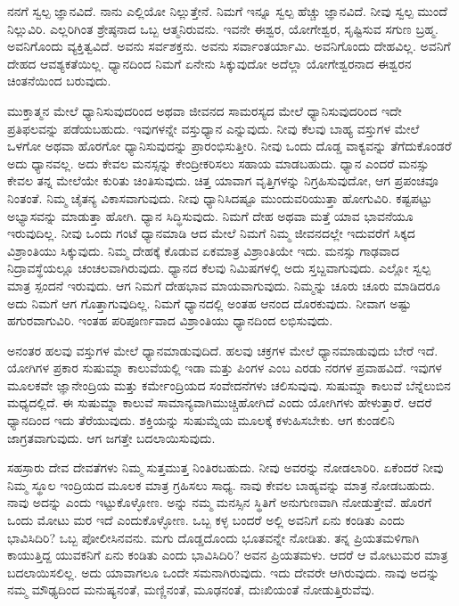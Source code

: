ನನಗೆ ಸ್ವಲ್ಪ ಜ್ಞಾನವಿದೆ. ನಾನು ಎಲ್ಲಿಯೋ ನಿಲ್ಲುತ್ತೇನೆ. ನಿಮಗೆ ಇನ್ನೂ ಸ್ವಲ್ಪ ಹೆಚ್ಚು ಜ್ಞಾನವಿದೆ. ನೀವು ಸ್ವಲ್ಪ ಮುಂದೆ ನಿಲ್ಲುವಿರಿ. ಎಲ್ಲರಿಗಿಂತ ಶ್ರೇಷ್ಠನಾದ ಒಬ್ಬ ಆತ್ಮನಿರುವನು. ಇವನೇ ಈಶ್ವರ, ಯೋಗೇಶ್ವರ, ಸೃಷ್ಟಿಸುವ ಸಗುಣ ಬ್ರಹ್ಮ. ಅವನಿಗೊಂದು ವ್ಯಕ್ತಿತ್ವವಿದೆ. ಅವನು ಸರ್ವಶಕ್ತನು. ಅವನು ಸರ್ವಾಂತರ್ಯಾಮಿ. ಅವನಿಗೊಂದು ದೇಹವಿಲ್ಲ. ಅವನಿಗೆ ದೇಹದ ಆವಶ್ಯಕತೆಯಿಲ್ಲ. ಧ್ಯಾನದಿಂದ ನಿಮಗೆ ಏನೇನು ಸಿಕ್ಕುವುದೋ ಅದೆಲ್ಲಾ ಯೋಗೇಶ್ವರನಾದ ಈಶ್ವರನ ಚಿಂತನೆಯಿಂದ ಬರುವುದು.

ಮುಕ್ತಾತ್ಮನ ಮೇಲೆ ಧ್ಯಾನಿಸುವುದರಿಂದ ಅಥವಾ ಜೀವನದ ಸಾಮರಸ್ಯದ ಮೇಲೆ ಧ್ಯಾನಿಸುವುದರಿಂದ ಇದೇ ಪ್ರತಿಫಲವನ್ನು ಪಡೆಯಬಹುದು. ಇವುಗಳನ್ನೇ ವಸ್ತುಧ್ಯಾನ ಎನ್ನುವುದು. ನೀವು ಕೆಲವು ಬಾಹ್ಯ ವಸ್ತುಗಳ ಮೇಲೆ ಒಳಗೋ ಅಥವಾ ಹೊರಗೋ ಧ್ಯಾನಿಸುವುದನ್ನು ಪ್ರಾರಂಭಿಸುತ್ತೀರಿ. ನೀವು ಒಂದು ದೊಡ್ಡ ವಾಕ್ಯವನ್ನು ತೆಗೆದುಕೊಂಡರೆ ಅದು ಧ್ಯಾನವಲ್ಲ. ಅದು ಕೇವಲ ಮನಸ್ಸನ್ನು ಕೇಂದ್ರೀಕರಿಸಲು ಸಹಾಯ ಮಾಡಬಹುದು. ಧ್ಯಾನ ಎಂದರೆ ಮನಸ್ಸು ಕೇವಲ ತನ್ನ ಮೇಲೆಯೇ ಕುರಿತು ಚಿಂತಿಸುವುದು. ಚಿತ್ತ ಯಾವಾಗ ವೃತ್ತಿಗಳನ್ನು ನಿಗ್ರಹಿಸುವುದೋ, ಆಗ ಪ್ರಪಂಚವೂ ನಿಂತಂತೆ. ನಿಮ್ಮ ಚೈತನ್ಯ ವಿಕಾಸವಾಗುವುದು. ನೀವು ಧ್ಯಾನಿಸಿದಷ್ಟೂ ಮುಂದುವರಿಯುತ್ತಾ ಹೋಗುವಿರಿ. ಕಷ್ಟಪಟ್ಟು ಅಭ್ಯಾಸವನ್ನು ಮಾಡುತ್ತಾ ಹೋಗಿ. ಧ್ಯಾನ ಸಿದ್ಧಿಸುವುದು. ನಿಮಗೆ ದೇಹ ಅಥವಾ ಮತ್ತೆ ಯಾವ ಭಾವನೆಯೂ ಇರುವುದಿಲ್ಲ. ನೀವು ಒಂದು ಗಂಟೆ ಧ್ಯಾನಮಾಡಿ ಆದ ಮೇಲೆ ನಿಮಗೆ ನಿಮ್ಮ ಜೀವನದಲ್ಲೇ ಇದುವರೆಗೆ ಸಿಕ್ಕದ ವಿಶ್ರಾಂತಿಯು ಸಿಕ್ಕುವುದು. ನಿಮ್ಮ ದೇಹಕ್ಕೆ ಕೊಡುವ ಏಕಮಾತ್ರ ವಿಶ್ರಾಂತಿಯೇ ಇದು. ಮನಸ್ಸು ಗಾಢವಾದ ನಿದ್ರಾವಸ್ಥೆಯಲ್ಲೂ ಚಂಚಲವಾಗಿರುವುದು. ಧ್ಯಾನದ ಕೆಲವು ನಿಮಿಷಗಳಲ್ಲಿ ಅದು ಸ್ತಬ್ದವಾಗುವುದು. ಎಲ್ಲೋ ಸ್ವಲ್ಪ ಮಾತ್ರ ಸ್ಪಂದನೆ ಇರುವುದು. ಆಗ ನಿಮಗೆ ದೇಹಭಾವ ಮಾಯವಾಗುವುದು. ನಿಮ್ಮನ್ನು ಚೂರು ಚೂರು ಮಾಡಿದರೂ ಅದು ನಿಮಗೆ ಆಗ ಗೊತ್ತಾಗುವುದಿಲ್ಲ. ನಿಮಗೆ ಧ್ಯಾನದಲ್ಲಿ ಅಂತಹ ಆನಂದ ದೊರಕುವುದು. ನೀವಾಗ ಅಷ್ಟು ಹಗುರವಾಗುವಿರಿ. ಇಂತಹ ಪರಿಪೂರ್ಣವಾದ ವಿಶ್ರಾಂತಿಯು ಧ್ಯಾನದಿಂದ ಲಭಿಸುವುದು.

ಅನಂತರ ಹಲವು ವಸ್ತುಗಳ ಮೇಲೆ ಧ್ಯಾನಮಾಡುವುದಿದೆ. ಹಲವು ಚಕ್ರಗಳ ಮೇಲೆ ಧ್ಯಾನಮಾಡುವುದು ಬೇರೆ ಇದೆ. ಯೋಗಿಗಳ ಪ್ರಕಾರ ಸುಷುಮ್ನಾ ಕಾಲುವೆಯಲ್ಲಿ ಇಡಾ ಮತ್ತು ಪಿಂಗಳ ಎಂಬ ಎರಡು ನರಗಳ ಪ್ರವಾಹವಿದೆ. ಇವುಗಳ ಮೂಲಕವೇ ಜ್ಞಾನೇಂದ್ರಿಯ ಮತ್ತು ಕರ್ಮೇಂದ್ರಿಯದ ಸಂವೇದನೆಗಳು ಚಲಿಸುವುವು. ಸುಷುಮ್ನಾ ಕಾಲುವೆ ಬೆನ್ನೆಲುಬಿನ ಮಧ್ಯದಲ್ಲಿದೆ. ಈ ಸುಷುಮ್ನಾ ಕಾಲುವೆ ಸಾಮಾನ್ಯವಾಗಿ\break ಮುಚ್ಚಿಹೋಗಿದೆ ಎಂದು ಯೋಗಿಗಳು ಹೇಳುತ್ತಾರೆ. ಆದರೆ ಧ್ಯಾನದಿಂದ ಇದು ತೆರೆಯುವುದು. ಶಕ್ತಿಯನ್ನು ಸುಷುಮ್ನೆಯ ಮೂಲಕ್ಕೆ ಕಳುಹಿಸಬೇಕು. ಆಗ ಕುಂಡಲಿನಿ ಜಾಗ್ರತವಾಗುವುದು. ಆಗ ಜಗತ್ತೇ ಬದಲಾಯಿಸುವುದು.

ಸಹಸ್ರಾರು ದೇವ ದೇವತೆಗಳು ನಿಮ್ಮ ಸುತ್ತಮುತ್ತ ನಿಂತಿರಬಹುದು. ನೀವು ಅವರನ್ನು ನೋಡಲಾರಿರಿ. ಏಕೆಂದರೆ ನೀವು ನಿಮ್ಮ ಸ್ಥೂಲ ಇಂದ್ರಿಯದ ಮೂಲಕ ಮಾತ್ರ ಗ್ರಹಿಸಲು ಸಾಧ್ಯ. ನಾವು ಕೇವಲ ಬಾಹ್ಯವನ್ನು ಮಾತ್ರ ನೋಡಬಹುದು. ನಾವು ಅದನ್ನು  ಎಂದು ಇಟ್ಟುಕೊಳ್ಳೋಣ.  ಅನ್ನು ನಮ್ಮ ಮನಸ್ಸಿನ ಸ್ಥಿತಿಗೆ ಅನುಗುಣವಾಗಿ ನೋಡುತ್ತೇವೆ. ಹೊರಗೆ ಒಂದು ಮೋಟು ಮರ ಇದೆ ಎಂದುಕೊಳ್ಳೋಣ. ಒಬ್ಬ ಕಳ್ಳ ಬಂದರೆ ಅಲ್ಲಿ ಅವನಿಗೆ ಏನು ಕಂಡಿತು ಎಂದು ಭಾವಿಸಿದಿರಿ? ಒಬ್ಬ ಪೋಲೀಸಿನವನು. ಮಗು ದೊಡ್ಡದೊಂದು ಭೂತವನ್ನೇ ನೋಡಿತು. ತನ್ನ ಪ್ರಿಯತಮಳಿಗಾಗಿ ಕಾಯುತ್ತಿದ್ದ ಯುವಕನಿಗೆ ಏನು ಕಂಡಿತು ಎಂದು ಭಾವಿಸಿದಿರಿ? ಅವನ ಪ್ರಿಯತಮಳು. ಆದರೆ ಆ ಮೋಟುಮರ ಮಾತ್ರ ಬದಲಾಯಿಸಲಿಲ್ಲ. ಅದು ಯಾವಾಗಲೂ ಒಂದೇ ಸಮನಾಗಿರುವುದು. ಇದು ದೇವರೇ ಆಗಿರುವುದು. ನಾವು ಅದನ್ನು ನಮ್ಮ ಮೌಢ್ಯದಿಂದ ಮನುಷ್ಯನಂತೆ, ಮಣ್ಣಿನಂತೆ, ಮೂಢನಂತೆ, ದುಃಖಿಯಂತೆ ನೋಡುತ್ತಿರುವೆವು.


